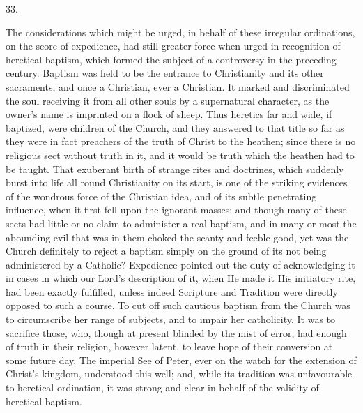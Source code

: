 33.

The considerations which might be urged, in behalf of these
irregular ordinations, on the score of expedience, had still greater
force when urged in recognition of heretical baptism, which formed the
subject of a controversy in the preceding century. Baptism was held to
be the entrance to Christianity and its other sacraments, and once a
Christian, ever a Christian. It marked and discriminated the soul
receiving it from all other souls by a supernatural character, as the
owner's name is imprinted on a flock of sheep. Thus heretics far and
wide, if baptized, were children of the Church, and they answered to
that title so far as they were in fact preachers of the truth of
Christ to the heathen; since there is no religious sect without truth
in it, and it would be truth which the heathen had to be taught. That
exuberant birth of strange rites and doctrines, which suddenly burst
into life all round Christianity on its start, is one of the striking
evidences of the wondrous force of the Christian idea, and of its
subtle penetrating influence, when it first fell upon the ignorant
masses: and though many of these sects had little or no claim to
administer a real baptism, and in many or most the abounding evil that
was in them choked the scanty and feeble good, yet was the Church
definitely to reject a baptism simply on the ground of its
not being administered by a Catholic? Expedience pointed out the duty
of acknowledging it in cases in which our Lord's description of it,
when He made it His initiatory rite, had been exactly fulfilled,
unless indeed Scripture and Tradition were directly opposed to such a
course. To cut off such cautious baptism from the Church was to
circumscribe her range of subjects, and to impair her catholicity. It
was to sacrifice those, who, though at present blinded by the mist of
error, had enough of truth in their religion, however latent, to leave
hope of their conversion at some future day. The imperial See of
Peter, ever on the watch for the extension of Christ's kingdom,
understood this well; and, while its tradition was unfavourable to
heretical ordination, it was strong and clear in behalf of the
validity of heretical baptism.

